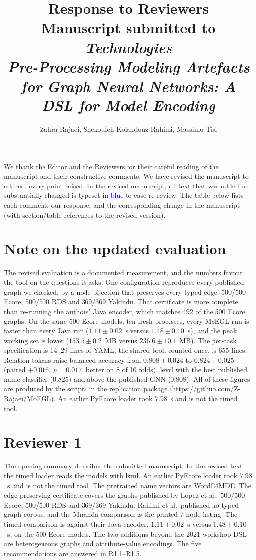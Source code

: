 \documentclass[11pt,a4paper]{article}
\title{Response to Reviewers\\[1ex]
\large Manuscript submitted to \emph{Technologies}\\
\emph{Pre-Processing Modeling Artefacts for Graph Neural Networks: A DSL for Model Encoding}}
\author{Zahra Rajaei, Shekoufeh Kolahdouz-Rahimi, Massimo Tisi}
\date{}
\newcommand{\rev}[1]{\textcolor{blue}{#1}}
\begin{document}
\maketitle

We thank the Editor and the Reviewers for their careful reading of the manuscript and their constructive comments. We have revised the manuscript to address every point raised. In the revised manuscript, all text that was added or substantially changed is typeset in \rev{blue} to ease re-review. The table below lists each comment, our response, and the corresponding change in the manuscript (with section/table references to the revised version).

\section*{Note on the updated evaluation}
The revised evaluation is a documented measurement, and the numbers favour the tool on the questions it asks. One configuration reproduces every published graph we checked, by a node bijection that preserves every typed edge: 500/500 Ecore, 500/500 RDS and 369/369 Yakindu. That certificate is more complete than re-running the authors' Java encoder, which matches 492 of the 500 Ecore graphs. On the same 500 Ecore models, ten fresh processes, every MoEGL run is faster than every Java run ($1.11\pm0.02$~s versus $1.48\pm0.10$~s), and the peak working set is lower ($153.5\pm0.2$~MB versus $236.6\pm10.1$~MB). The per-task specification is 14--29 lines of YAML; the shared tool, counted once, is 655 lines. Relation tokens raise balanced accuracy from $0.808\pm0.024$ to $0.824\pm0.025$ (paired $+0.016$, $p=0.017$, better on 8 of 10 folds), level with the best published name classifier (0.825) and above the published GNN (0.808). All of these figures are produced by the scripts in the replication package (\url{https://github.com/Z-Rajaei/MoEGL}). An earlier PyEcore loader took $7.98$~s and is not the timed tool.

\section*{Reviewer 1}

The opening summary describes the submitted manuscript. In the revised text the timed loader reads the models with lxml. An earlier PyEcore loader took $7.98$~s and is not the timed tool. The pretrained name vectors are WordE4MDE. The edge-preserving certificate covers the graphs published by Lopez et al.: 500/500 Ecore, 500/500 RDS and 369/369 Yakindu. Rahimi et al.\ published no typed-graph corpus, and the Miranda comparison is the printed 7-node listing. The timed comparison is against their Java encoder, $1.11\pm0.02$~s versus $1.48\pm0.10$~s, on the 500 Ecore models. The two additions beyond the 2021 workshop DSL are heterogeneous graphs and attribute-value encodings. The five recommendations are answered in R1.1--R1.5.
\end{document}
